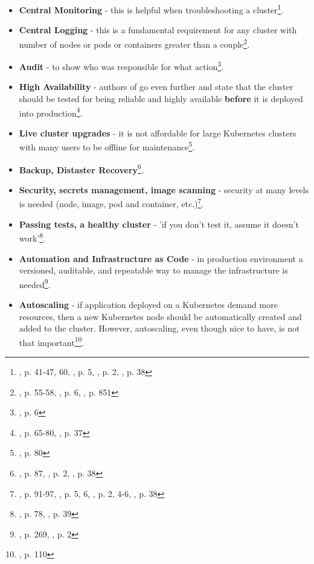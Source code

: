 \begin{itemize}
\item \textbf{Central Monitoring} - this is helpful when troubleshooting a cluster\footnote{\cite{book-mastering-k8s}, p. 41-47, 60, \cite{online-weave-checklists}, p. 5, \cite{online-weave-guide}, p. 2, \cite{book-cndwk}, p. 38}.
\item \textbf{Central Logging} - this is a fundamental requirement for any cluster with number of nodes or pods or containers greater than a couple\footnote{\cite{book-mastering-k8s}, p. 55-58, \cite{online-weave-checklists}, p. 6, \cite{book-devops-k8s}, p. 851}.
\item \textbf{Audit} - to show who was responsible for what action\footnote{\cite{online-weave-guide}, p. 6}.
\item \textbf{High Availability} - authors of \cite{book-mastering-k8s} go even further and state that the cluster should be tested for being reliable and highly available \textbf{before} it is deployed into production\footnote{\cite{book-mastering-k8s}, p. 65-80, \cite{book-cndwk}, p. 37}.
\item \textbf{Live cluster upgrades} - it is not affordable for large Kubernetes clusters with many users to be offline for maintenance\footnote{\cite{book-mastering-k8s}, p. 80}.
\item \textbf{Backup, Distaster Recovery}\footnote{\cite{book-mastering-k8s}, p. 87, \cite{online-weave-guide}, p. 2, \cite{book-cndwk}, p. 38}.
\item \textbf{Security, secrets management, image scanning} - security at many levels is needed (node, image, pod and container, etc.)\footnote{\cite{book-mastering-k8s}, p. 91-97, \cite{online-weave-checklists}, p. 5, 6, \cite{online-weave-guide}, p. 2, 4-6, \cite{book-cndwk}, p. 38}.
\item \textbf{Passing tests, a healthy cluster} - 'if you don't test it, assume it doesn't work'\footnote{\cite{book-mastering-k8s}, p. 78, \cite{book-cndwk}, p. 39}.
\item \textbf{Automation and Infrastructure as Code} - in production environment a versioned, auditable, and repeatable way to manage the infrastructure is needed\footnote{\cite{book-mastering-k8s}, p. 269, \cite{online-weave-guide}, p. 2}.
\item \textbf{Autoscaling} - if application deployed on a Kubernetes demand more resources, then a new Kubernetes node should be automatically created and added to the cluster. However, autoscaling, even though nice to have, is not that important\footnote{\cite{book-cndwk}, p. 110}.
\end{itemize}

